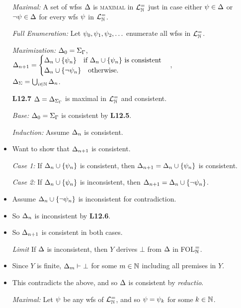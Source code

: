 \documentclass[a4paper, 11pt]{article} %
\begin{document}
\begin{itemize}
  \item[\it Maximal:] A set of wfss $\Delta$ is \textsc{maximal} in $\mathcal{L}^{=}_{\mathbb{N}}$ just in case either $\psi\in\Delta$ or $\neg\psi\in\Delta$ for every wfs $\psi$ in $\mathcal{L}^{=}_{\mathbb{N}}$.
  \item[\it Full Enumeration:] Let $\psi_0,\psi_1,\psi_2,\ldots$ enumerate all wfss in $\mathcal{L}^{=}_{\mathbb{N}}$.
  \item[\it Maximization:]
    $\Delta_0 = \Sigma_{\Gamma}$,\\ 
    $\Delta_{n+1} =
      \begin{cases}
        \Delta_n\cup\lbrace\psi_n\rbrace ~~\text{ if } \Delta_n\cup\lbrace\psi_n\rbrace \text{ is consistent}\\
        \Delta_n\cup\lbrace\neg\psi_n\rbrace ~~\text{ otherwise}.
      \end{cases}$,\\
    $\Delta_{\Sigma} = \bigcup_{i\in\mathbb{N}}\Delta_n$. 
  \item[\bf L12.7] $\Delta=\Delta_{\Sigma_{\Gamma}}$ is maximal in $\mathcal{L}^{=}_{\mathbb{N}}$ and consistent. 
  \item[\it Base:] $\Delta_0 = \Sigma_{\Gamma}$ is consistent by \textbf{L12.5}. 
  \item[\it Induction:] Assume $\Delta_n$ is consistent.
    \item Want to show that $\Delta_{n+1}$ is consistent. 
  \item[\it Case 1:] If $\Delta_n\cup\lbrace\psi_n\rbrace$ is consistent, then $\Delta_{n+1}=\Delta_n\cup\lbrace\psi_n\rbrace$ is consistent. 
  \item[\it Case 2:] If $\Delta_n\cup\lbrace\psi_n\rbrace$ is inconsistent, then $\Delta_{n+1}=\Delta_n\cup\lbrace\neg\psi_n\rbrace$.
    \item Assume $\Delta_n\cup\lbrace\neg\psi_n\rbrace$ is inconsistent for contradiction.
    \item So $\Delta_n$ is inconsistent by \textbf{L12.6}. 
    \item So $\Delta_{n+1}$ is consistent in both cases. 
  \item[\it Limit] If $\Delta$ is inconsistent, then $Y$ derives $\bot$ from $\Delta$ in FOL$^=_{\mathbb{N}}$. 
    \item Since $Y$ is finite, $\Delta_m\vdash\bot$ for some $m\in\mathbb{N}$ including all premises in $Y$.
    \item This contradicts the above, and so $\Delta$ is consistent by \textit{reductio}. 
  \item[\it Maximal:] Let $\psi$ be any wfs of $\mathcal{L}^{=}_{\mathbb{N}}$, and so $\psi=\psi_k$ for some $k \in \mathbb{N}$. 

\end{itemize}
\end{document}

